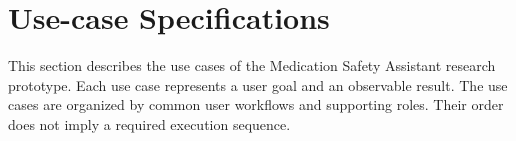\section{Use-case Specifications}
This section describes the use cases of the
Medication Safety Assistant research prototype.
Each use case represents a user goal and an
observable result.
The use cases are organized by common user
workflows and supporting roles. Their order
does not imply a required execution sequence.

\providecommand{\UCchange}[1]{\textcolor{blue}{#1}}
